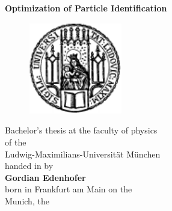 \thispagestyle{empty}
\begin{center}
	\begin{LARGE}
		{
			\bf
			\hspace*{1cm} Optimization of Particle Identification \\ [0.3cm]
		}
	\end{LARGE}
	\vspace{0.5cm}
	\begin{figure}[htbp]
		\begin{center}
			\hspace*{1cm}
			\includegraphics[height=4cm]{pics/lmu3.pdf}
		\end{center}
	\end{figure}

	\vspace{1.0cm}
	\begin{large}
		\hspace*{1cm}Bachelor's thesis at the faculty of physics \\
		\hspace*{1cm}of the \\
		\hspace*{1cm}Ludwig-Maximilians-Universität München \\ [2.5cm]
		\hspace*{1cm}handed in by \\
		{\bf
		\hspace*{1cm}Gordian Edenhofer \\ }
		\hspace*{1cm}born in Frankfurt am Main on the  \\ [0.5cm]
		\hspace*{1cm}Munich, the 
	\end{large}
\end{center}
